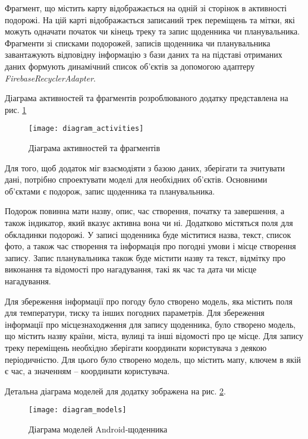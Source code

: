 \documentclass[../main.tex]{subfiles}
\begin{document}
Фрагмент, що містить карту відображається на одній зі сторінок в активності подорожі. На цій карті відображається записаний трек переміщень та мітки, які можуть одначати початок чи кінець треку та запис щоденника чи планувальника. Фрагменти зі списками подорожей, записів щоденника чи планувальника завантажують відповідну інформацію з бази даних та на підставі отриманих даних формують динамічний список об'єктів за допомогою адаптеру \textit{FirebaseRecyclerAdapter}.

Діаграма активностей та фрагментів розроблюваного додатку представлена на рис. \ref{diagram:activities}

\begin{figure}[H]
	\centering
	\texttt{[image: diagram\_activities]}
	\caption{Діаграма активностей та фрагментів}
	\label{diagram:activities}
\end{figure}

Для того, щоб додаток міг взаємодіяти з базою даних, зберігати та зчитувати дані, потрібно спроектувати моделі для необхідних об'єктів. Основними об'єктами є подорож, запис щоденника та планувальника.

Подорож повинна мати назву, опис, час створення, початку та завершення, а також індикатор, який вказує активна вона чи ні. Додатково містяться поля для обкладинки подорожі. У записі щоденника буде міститися назва, текст, список фото, а також час створення та інформація про погодні умови і місце створення запису. Запис планувальника також буде містити назву та текст, відмітку про виконання та відомості про нагадування, такі як час та дата чи місце нагадування.

Для збереження інформації про погоду було створено модель, яка містить поля для температури, тиску та інших погодних параметрів. Для збереження інформації про місцезнаходження для запису щоденника, було створено модель, що містить назву країни, міста, вулиці та інші відомості про це місце. Для запису треку переміщень необхідно зберігати координати користувача з деякою періодичністю. Для цього було створено модель, що містить мапу, ключем в якій є час, а значенням -- координати користувача.

Детальна діаграма моделей для додатку зображена на рис. \ref{diagram:models}.

\begin{figure}[H]
	\centering
	\texttt{[image: diagram\_models]}
	\caption{Діаграма моделей Android-щоденника}
	\label{diagram:models}
\end{figure}
\end{document}

